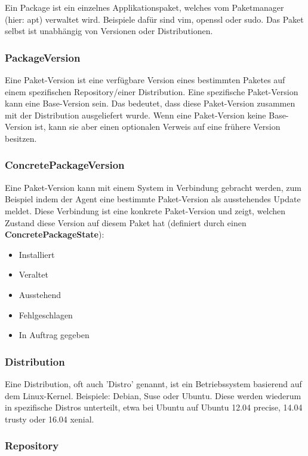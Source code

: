Ein Package ist ein einzelnes Applikationspaket, welches vom Paketmanager (hier: \gls{apt}) verwaltet wird. Beispiele dafür sind vim, openssl oder sudo. Das Paket selbst ist unabhängig von Versionen oder Distributionen.

\subsubsection{PackageVersion}

Eine Paket-Version ist eine verfügbare Version eines bestimmten Paketes auf einem spezifischen Repository/einer Distribution. Eine spezifische Paket-Version kann eine Base-Version sein. Das bedeutet, dass diese Paket-Version zusammen mit der Distribution ausgeliefert wurde. Wenn eine Paket-Version keine Base-Version ist, kann sie aber einen optionalen Verweis auf eine frühere Version besitzen.

\subsubsection{ConcretePackageVersion}

Eine Paket-Version kann mit einem System in Verbindung gebracht werden, zum Beispiel indem der Agent eine bestimmte Paket-Version als ausstehendes Update meldet. Diese Verbindung ist eine konkrete Paket-Version und zeigt, welchen Zustand diese Version auf diesem Paket hat (definiert durch einen \textbf{ConcretePackageState}):

\begin{itemize}
    \item Installiert
    \item Veraltet
    \item Ausstehend
    \item Fehlgeschlagen
    \item In Auftrag gegeben
\end{itemize}


\subsubsection{Distribution}

Eine Distribution, oft auch 'Distro' genannt, ist ein Betriebssystem basierend auf dem Linux-Kernel. Beispiele: Debian, Suse oder Ubuntu. Diese werden wiederum in spezifische Distros unterteilt, etwa bei Ubuntu auf Ubuntu 12.04 precise, 14.04 trusty oder 16.04 xenial.

\subsubsection{Repository}

